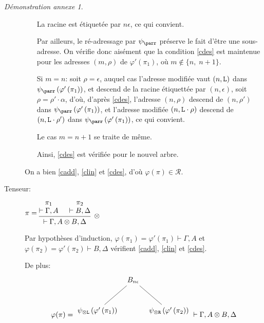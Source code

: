 \documentclass[11pt,a4paper]{article}
\theoremstyle{plain}
\theoremstyle{definition}
\theoremstyle{remark}
\newtheorem{demonstrationappendix}{Démonstration annexe}
\newcommand*{\tensor}{\otimes}
\newcommand*{\namedproofv}[2]{\hypo{#1}\infer[no rule]{1}{\vdash #2}}
\newcommand*{\tensorv}[1]{\infer{2}[\ensuremath{\tensor}]{\vdash #1}}
\newcommand*{\someadd}{\rho}
\newcommand*{\someproof}{\pi}
\newcommand*{\sequent}{\Gamma}
\newcommand*{\sequentbis}{\Delta}
\newcommand*{\Left}{\textnormal{\texttt{L}}}
\newcommand*{\Right}{\textnormal{\texttt{R}}}
\newcommand*{\representations}{\ensuremath{\mathcal{R}}}
\newcommand*{\encode}{\ensuremath{\varphi}}
\begin{document}
\begin{demonstrationappendix}
\begin{description}
\begin{enumerate}
        La racine est étiquetée par $n \epsilon$, ce qui convient.

        Par ailleurs, le ré-adressage par $\psi_\parr$ préserve le fait d'être une sous-adresse. On vérifie donc aisément que la condition \ref{cdes} est maintenue pour les adresses $(m, \someadd)$ de $\encode' \left( \pi_1 \right)$, où $m \notin \{ n, \; n+1 \}$.
        
        Si $m = n$: soit $\someadd = \epsilon$, auquel cas l'adresse modifiée vaut $(n, \Left)$ dans $\psi_\parr \left( \encode' \left( \pi_1 \right) \right)$, et descend de la racine étiquettée par $(n, \epsilon)$, soit $\someadd = \someadd' \cdot \alpha$, d'où, d'après \ref{cdes}, l'adresse $(n, \someadd)$ descend de $(n, \someadd')$ dans $\psi_\parr \left( \encode' \left( \pi_1 \right) \right)$, et l'adresse modifiée $(n, \Left \cdot \someadd)$ descend de $(n, \Left \cdot \someadd')$ dans $\psi_\parr \left( \encode' \left( \pi_1 \right) \right)$, ce qui convient.

        Le cas $m = n+1$ se traite de même.

        Ainsi, \ref{cdes} est vérifiée pour le nouvel arbre.
    \end{enumerate} 

    On a bien \ref{cadd}, \ref{clin} et \ref{cdes}, d'où $\encode \left( \someproof \right) \in \representations$.

     \item[Tenseur:] $\someproof =
    \begin{prooftree}
      \namedproofv{\pi_1}{\sequent, A}
      \namedproofv{\pi_2}{B, \sequentbis}
      \tensorv{\sequent, A \tensor B, \sequentbis}
    \end{prooftree}$

    Par hypothèses d'induction, $\encode \left( \pi_1 \right) = \encode ' \left( \pi_1 \right) \vdash \sequent, A$ et $\encode \left( \pi_2 \right) = \encode ' \left( \pi_2 \right) \vdash B, \sequentbis$ vérifient \ref{cadd}, \ref{clin} et \ref{cdes}.
    
    De plus:
    \begin{equation*}
    \encode ( \someproof ) = \begin{tikzpicture}%
    [level distance=1.5cm,
    level 1/.style={sibling distance=3.5cm}]
    \node {$B_{n \epsilon}$}
        child {node {$\psi_{\tensor\Left} \left( \encode' \left( \pi_1 \right) \right)$}}
        child {node {$\psi_{\tensor\Right} \left( \encode' \left( \pi_2 \right) \right)$}
    };
    \end{tikzpicture} \vdash \sequent, A \tensor B, \sequentbis
    \end{equation*}


\end{description}
\end{demonstrationappendix}
\end{document}
